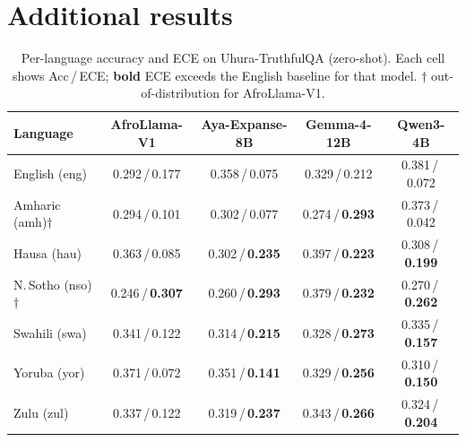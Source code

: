\documentclass[pmlr]{jmlr}%
\begin{document}
\section{Additional results}\label{app:figs}

\begin{table}[H]\centering\small
\caption{Per-language accuracy and ECE on Uhura-TruthfulQA (zero-shot). Each cell shows Acc\,/\,ECE;
\textbf{bold} ECE exceeds the English baseline for that model. $\dagger$ out-of-distribution for
AfroLlama-V1.}
\label{tab:uhura_lang}
\begin{tabular}{lcccc}
\toprule
\textbf{Language} & \textbf{AfroLlama-V1} & \textbf{Aya-Expanse-8B} & \textbf{Gemma-4-12B} & \textbf{Qwen3-4B}\\
\midrule
English (eng)               & 0.292\,/\,0.177 & 0.358\,/\,0.075 & 0.329\,/\,0.212 & 0.381\,/\,0.072\\
\midrule
Amharic (amh)$\dagger$      & 0.294\,/\,0.101 & 0.302\,/\,0.077 & 0.274\,/\,\textbf{0.293} & 0.373\,/\,0.042\\
Hausa (hau)                 & 0.363\,/\,0.085 & 0.302\,/\,\textbf{0.235} & 0.397\,/\,\textbf{0.223} & 0.308\,/\,\textbf{0.199}\\
N.\,Sotho (nso)$\dagger$    & 0.246\,/\,\textbf{0.307} & 0.260\,/\,\textbf{0.293} & 0.379\,/\,\textbf{0.232} & 0.270\,/\,\textbf{0.262}\\
Swahili (swa)               & 0.341\,/\,0.122 & 0.314\,/\,\textbf{0.215} & 0.328\,/\,\textbf{0.273} & 0.335\,/\,\textbf{0.157}\\
Yoruba (yor)                & 0.371\,/\,0.072 & 0.351\,/\,\textbf{0.141} & 0.329\,/\,\textbf{0.256} & 0.310\,/\,\textbf{0.150}\\
Zulu (zul)                  & 0.337\,/\,0.122 & 0.319\,/\,\textbf{0.237} & 0.343\,/\,\textbf{0.266} & 0.324\,/\,\textbf{0.204}\\
\bottomrule
\end{tabular}
\end{table}
\end{document}
